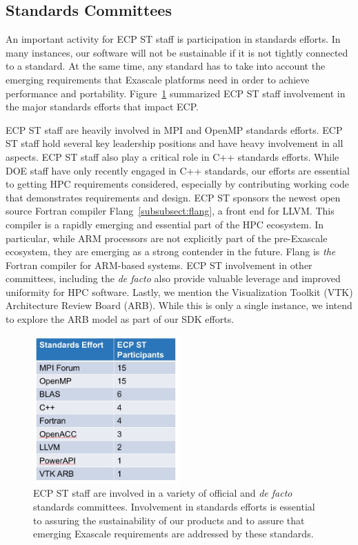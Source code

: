 \subsection{Standards Committees}
An important activity for ECP ST staff is participation in standards efforts.  In many instances, our software will not be sustainable if it is not tightly connected to a standard.  At the same time, any standard has to take into account the emerging requirements that Exascale platforms need in order to achieve performance and portability.  Figure~\ref{fig:standards} summarized ECP ST staff involvement in the major standards efforts that impact ECP.

ECP ST staff are heavily involved in MPI and OpenMP standards efforts.  ECP ST staff hold several key leadership positions and have heavy involvement in all aspects. ECP ST staff also play a critical role in C++ standards efforts.  While DOE staff have only recently engaged in C++ standards, our efforts are essential to  getting HPC requirements considered, especially by contributing working code that demonstrates requirements and design. ECP ST sponsors the newest open source Fortran compiler Flang~\ref{subsubsect:flang}, a front end for LLVM.  This compiler is a rapidly emerging and essential part of the HPC ecosystem.  In particular, while ARM processors are not explicitly part of the pre-Exascale ecosystem, they are emerging as a strong contender in the future.  Flang is \textit{the} Fortran compiler for ARM-based systems.  ECP ST involvement in other committees, including the \textit{de facto} also provide valuable leverage and improved uniformity for HPC software.  Lastly, we mention the Visualization Toolkit (VTK) Architecture Review Board (ARB).  While this is only a single instance, we intend to explore the ARB model as part of our SDK efforts.
\begin{figure}[htb]
	\begin{center}
		\includegraphics[width=0.5\textwidth]{StandardsInvolvement}
		
		\caption{\label{fig:standards} ECP ST staff are involved in a variety of official and \textit{de facto} standards committees.  Involvement in standards efforts is essential to assuring the sustainability of our products and to assure that emerging Exascale requirements are addressed by these standards.}
	\end{center}
\end{figure}
